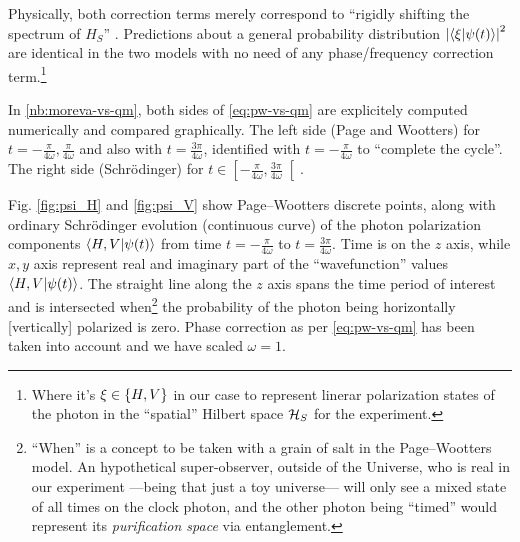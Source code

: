 Physically, both correction terms merely
correspond to ``rigidly shifting the spectrum of $H_S$'' \parencite{Lloyd:Time}.
Predictions about a general probability distribution
$\abs{\braket{\xi}{\psi(t)}}^2$
are identical in the two models with no need of any phase/frequency correction term.\footnote{
  Where it's $\xi \in \qty{H, V}$
  in our case to represent linerar polarization states of the photon in
  the ``spatial'' Hilbert space $\mathcal{H}_S$
  for the experiment.
}

\begin{spacing}{1.5}
  In \ref{nb:moreva-vs-qm},
  both sides of \eqref{eq:pw-vs-qm} are
  explicitely computed numerically and compared graphically.
  The left side (Page and Wootters)
  for $t = -\frac{\pi}{4\omega}, \frac{\pi}{4\omega}$ and also with
  $t = \frac{3\pi}{4\omega}$, identified with $t = -\frac{\pi}{4\omega}$
  to ``complete the cycle''.
  The right side (Schr{\"o}dinger) for
  $t \in \left[-\frac{\pi}{4\omega}, \frac{3\pi}{4\omega}\right[$.
\end{spacing}

Fig. \ref{fig:psi_H} and \ref{fig:psi_V} show
Page--Wootters discrete points, along with
ordinary Schr{\"o}dinger evolution (continuous curve)
of the photon polarization components
$\braket{H,V}{\psi(t)}$
from time $t = -\frac{\pi}{4\omega}$
to $t = \frac{3\pi}{4\omega}$. Time is on the $z$ axis,
while $x, y$ axis represent real and imaginary part of
the ``wavefunction'' values $\braket{H,V}{\psi(t)}$.
The straight line along the $z$ axis
spans the time period of interest
and is intersected when\footnote{
  ``When'' is a concept to be taken with a grain of salt in the Page--Wootters model.
  An hypothetical super-observer, outside of the Universe,
  who is real in our experiment ---being that just a toy universe---
  will only see a mixed state of all times on the clock photon, and the other
  photon being ``timed'' would represent its \emph{purification space}
  via entanglement.
}
the probability of the photon being
horizontally [vertically] polarized is zero.
Phase correction as per \eqref{eq:pw-vs-qm} has been taken into account
and we have scaled $\omega=1$.

